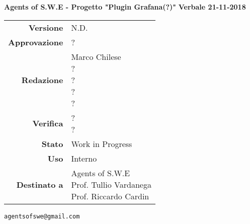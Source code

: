 


\begin{titlepage}
\thispagestyle{empty}

\begin{center}
\large \textbf{Agents of S.W.E - Progetto "Plugin Grafana(?)"}
\vfill
\Huge \textbf{Verbale 21-11-2018}
\vfill
\large
\renewcommand{\arraystretch}{1.3}
\begin{tabular}{r|l}
\textbf{Versione} & N.D.\\
\textbf{Approvazione} & ?\\
\textbf{Redazione} & \parbox[t]{5cm}{Marco Chilese\\?\\?\\?\\?}\\
\textbf{Verifica} & \parbox[t]{5cm}{?\\?}\\
\textbf{Stato} & Work in Progress\\
\textbf{Uso} & Interno\\
\textbf{Destinato a} & \parbox[t]{5cm}{Agents of S.W.E \\Prof. Tullio Vardanega\\Prof. Riccardo Cardin}
\end{tabular}
\vfill
\small
\texttt{agentsofswe@gmail.com}
\end{center}
\end{titlepage}

\pagebreak














